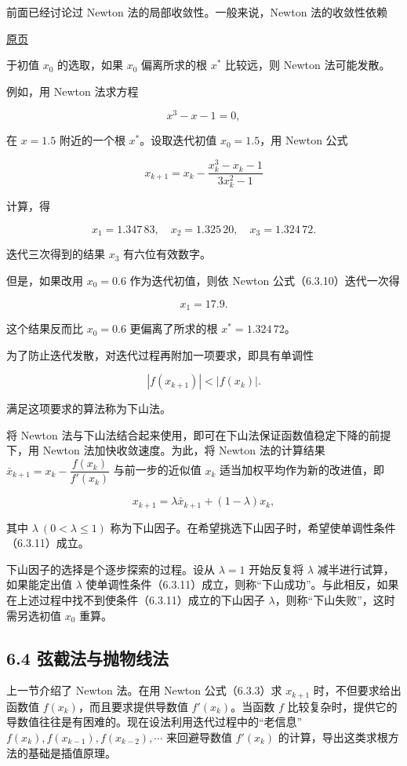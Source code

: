 \documentclass[
  10pt,
  fontset=fandol]{ctexart}
\begin{document}
前面已经讨论过 Newton 法的局部收敛性。一般来说，Newton 法的收敛性依赖

\href{../../source-images/pdf-167.jpeg}{原页}

于初值 \(x_0\) 的选取，如果 \(x_0\) 偏离所求的根 \(x^*\) 比较远，则 Newton 法可能发散。

例如，用 Newton 法求方程

\[
x^3-x-1=0,
\tag{6.3.9}
\]

在 \(x=1.5\) 附近的一个根 \(x^*\)。设取迭代初值 \(x_0=1.5\)，用 Newton 公式

\[
x_{k+1}=x_k-\frac{x_k^3-x_k-1}{3x_k^2-1}
\tag{6.3.10}
\]

计算，得

\[
x_1=1.347\,83,\quad x_2=1.325\,20,\quad x_3=1.324\,72.
\]

迭代三次得到的结果 \(x_3\) 有六位有效数字。

但是，如果改用 \(x_0=0.6\) 作为迭代初值，则依 Newton 公式（6.3.10）迭代一次得

\[
x_1=17.9.
\]

这个结果反而比 \(x_0=0.6\) 更偏离了所求的根 \(x^*=1.324\,72\)。

为了防止迭代发散，对迭代过程再附加一项要求，即具有单调性

\[
|f(x_{k+1})|<|f(x_k)|.
\tag{6.3.11}
\]

满足这项要求的算法称为下山法。

将 Newton 法与下山法结合起来使用，即可在下山法保证函数值稳定下降的前提下，用 Newton 法加快收敛速度。为此，将 Newton 法的计算结果 \(\bar{x}_{k+1}=x_k-\dfrac{f(x_k)}{f'(x_k)}\) 与前一步的近似值 \(x_k\) 适当加权平均作为新的改进值，即

\[
x_{k+1}=\lambda\bar{x}_{k+1}+(1-\lambda)x_k,
\tag{6.3.12}
\]

其中 \(\lambda\ (0<\lambda\leqslant1)\) 称为下山因子。在希望挑选下山因子时，希望使单调性条件（6.3.11）成立。

下山因子的选择是个逐步探索的过程。设从 \(\lambda=1\) 开始反复将 \(\lambda\) 减半进行试算，如果能定出值 \(\lambda\) 使单调性条件（6.3.11）成立，则称``下山成功''。与此相反，如果在上述过程中找不到使条件（6.3.11）成立的下山因子 \(\lambda\)，则称``下山失败''，这时需另选初值 \(x_0\) 重算。

\subsection{6.4 弦截法与抛物线法}\label{ux5f26ux622aux6cd5ux4e0eux629bux7269ux7ebfux6cd5}

上一节介绍了 Newton 法。在用 Newton 公式（6.3.3）求 \(x_{k+1}\) 时，不但要求给出函数值 \(f(x_k)\)，而且要求提供导数值 \(f'(x_k)\)。当函数 \(f\) 比较复杂时，提供它的导数值往往是有困难的。现在设法利用迭代过程中的``老信息''\(f(x_k),f(x_{k-1}),f(x_{k-2}),\cdots\) 来回避导数值 \(f'(x_k)\) 的计算，导出这类求根方法的基础是插值原理。
\end{document}
